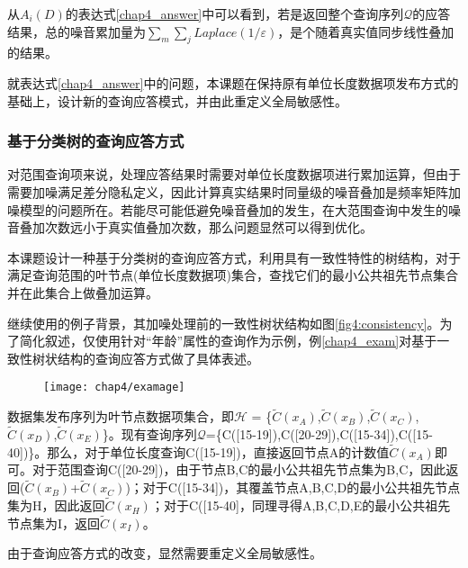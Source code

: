 从$A_{i}(D)$的表达式\ref{chap4_answer}中可以看到，若是返回整个查询序列$\mathcal{Q}$的应答结果，总的噪音累加量为$\sum\limits_m {\sum\limits_j \textit{Laplace}(1/\varepsilon)}$，是个随着真实值同步线性叠加的结果。

就表达式\ref{chap4_answer}中的问题，本课题在保持原有单位长度数据项发布方式的基础上，设计新的查询应答模式，并由此重定义全局敏感性。

\subsubsection{基于分类树的查询应答方式}
对范围查询项来说，处理应答结果时需要对单位长度数据项进行累加运算，但由于需要加噪满足差分隐私定义，因此计算真实结果时同量级的噪音叠加是频率矩阵加噪模型的问题所在。若能尽可能低避免噪音叠加的发生，在大范围查询中发生的噪音叠加次数远小于真实值叠加次数，那么问题显然可以得到优化。

本课题设计一种基于分类树的查询应答方式，利用具有一致性特性的树结构，对于满足查询范围的叶节点(单位长度数据项)集合，查找它们的最小公共祖先节点集合并在此集合上做叠加运算。

继续使用\label{chap3_exmp}的例子背景，其加噪处理前的一致性树状结构如图\ref{fig4:consistency}。为了简化叙述，仅使用针对“年龄”属性的查询作为示例，例\ref{chap4_exam}对基于一致性树状结构的查询应答方式做了具体表述。

\begin{figure}[!htp]
	\centering
	\texttt{[image: chap4/examage]}
\end{figure}

\begin{exmp}
	\label{chap4_exam}
数据集发布序列为叶节点数据项集合，即$\mathcal{H}$ = \{$\widetilde{C}(x_{A})$,$\widetilde{C}(x_{B})$,$\widetilde{C}(x_{C})$,$\widetilde{C}(x_{D})$,$\widetilde{C}(x_{E})$\}。现有查询序列$\mathcal{Q}$=\{C([15-19]),C([20-29]),C([15-34]),C([15-40])\}。那么，对于单位长度查询C([15-19])，直接返回节点A的计数值$\widetilde{C}(x_{A})$即可。对于范围查询C([20-29])，由于节点B,C的最小公共祖先节点集为{B,C}，因此返回($\widetilde{C}(x_{B})$+$\widetilde{C}(x_{C})$)；对于C([15-34])，其覆盖节点A,B,C,D的最小公共祖先节点集为{H}，因此返回$\widetilde{C}(x_{H})$；对于C([15-40]，同理寻得A,B,C,D,E的最小公共祖先节点集为{I}，返回$\widetilde{C}(x_{I})$。
\end{exmp}

由于查询应答方式的改变，显然需要重定义全局敏感性。

